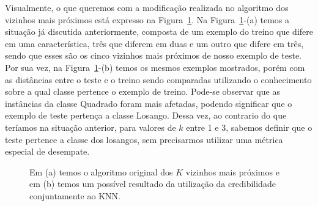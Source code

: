 Visualmente, o que queremos com a modificação realizada no algoritmo dos vizinhos mais próximos está expresso na Figura~\ref{fig::KNNantesedepois}. Na Figura~\ref{fig::KNNantesedepois}-(a) temos a situação já discutida anteriormente, composta de um exemplo do treino que difere em uma característica, três que diferem em duas e um outro que difere em três, sendo que esses são os cinco vizinhos mais próximos de nosso exemplo de teste. Por sua vez, na Figura~\ref{fig::KNNantesedepois}-(b) temos os mesmos exemplos mostrados, porém com as distâncias entre o teste e o treino sendo comparadas utilizando o conhecimento sobre a qual classe pertence o exemplo de treino. Pode-se observar que as instâncias da classe Quadrado foram mais afetadas, podendo significar que o exemplo de teste pertença a classe Losango. Dessa vez, ao contrario do que teríamos na situação anterior, para valores de $k$ entre 1 e 3, sabemos definir que o teste pertence a classe dos losangos, sem precisarmos utilizar uma métrica especial de desempate. 

\begin{figure}[ht]
\centering
{}
\caption{Em (a) temos o algoritmo original dos $K$ vizinhos mais próximos e em (b) temos um possível resultado da utilização da credibilidade conjuntamente ao \textsc{KNN}.  
\label{fig::KNNantesedepois}}
\end{figure}

